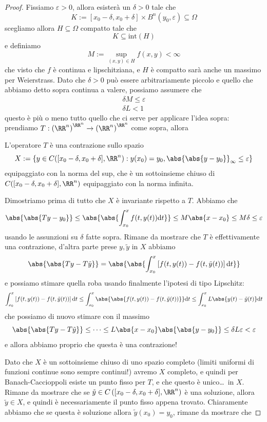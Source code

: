 \documentclass[11pt]{scrartcl}
\newcommand{\dif}{\text{d}}
\begin{document}
	\begin{proof}
		Fissiamo $\varepsilon>0$, allora esisterà un $\delta>0$ tale che
		$$K:=[x_0-\delta,x_0+\delta]\times B^n(y_0,\varepsilon)\subseteq\Omega$$
		scegliamo allora $H\subseteq \Omega$ compatto tale che
		$$K\subseteq \text{int}(H)$$
		e definiamo
		$$M:=\sup_{(x,y)\in H}f(x,y)<\infty$$
		che visto che $f$ è continua e lipschitziana, e $H$ è compatto sarà anche un massimo per Weierstrass. Dato che $\delta>0$ può essere arbitrariamente piccolo e quello che abbiamo detto sopra continua a valere, possiamo assumere che 
		\begin{gather*}
			\delta M \le \varepsilon \\
			\delta L <1
		\end{gather*}
		questo è più o meno tutto quello che ci serve per applicare l'idea sopra: prendiamo $T:\left(\RR^{n}\right)^{\RR^{n}}\to\left(\RR^{n}\right)^{\RR^{n}}$ come sopra, allora 
		\begin{claim}
			L'operatore $T$ è una contrazione sullo spazio
			$$X:=\left\{y\in C([x_0-\delta,x_0+\delta],\RR^n):y(x_0)=y_0,\abs{\abs{y-y_0}}_\infty\le \varepsilon\right\}$$
			equipaggiato con la norma del sup, che è un sottoinsieme chiuso di $C([x_0-\delta,x_0+\delta],\RR^n)$ equipaggiato con la norma infinita.
		\end{claim}
		\begin{subproof}[Sottodimostrazione]
			Dimostriamo prima di tutto che $X$ è invariante rispetto a $T$. Abbiamo che
			$$\abs{\abs{Ty-y_0}}\le \abs{\abs{\int_{x_0}^x f(t,y(t))\dif t}}\le M\abs{x-x_0}\le M\delta \le \varepsilon$$
			usando le assunzioni su $\delta$ fatte sopra. Rimane da mostrare che $T$ è effettivamente una contrazione, d'altra parte prese $y,\tilde{y}$ in $X$ abbiamo
			$$\abs{\abs{Ty-T\tilde{y}}}=\abs{\abs{\int_{x_0}^x\left[ f(t,y(t))-f(t,\tilde{y}(t))\right]\dif t}}$$ 
			e possiamo stimare quella roba usando finalmente l'ipotesi di tipo Lipschitz: 
			$$\int_{x_0}^x\left[ f(t,y(t))-f(t,\tilde{y}(t))\right]\dif t\le \int_{x_0}^x \abs{\abs{f(t,y(t))-f(t,\tilde{y}(t))}}\dif t\le \int_{x_0}^x L\abs{y(t)-\tilde{y}(t)}\dif t$$
			che possiamo di nuovo stimare con il massimo
			$$\abs{\abs{Ty-T\tilde{y}}}\le\dots\le L\abs{x-x_0}\abs{\abs{y-y_0}}\le \delta L\varepsilon<\varepsilon$$
			e allora abbiamo proprio che questa è una contrazione!
		\end{subproof}
		Dato che $X$ è un sottoinsieme chiuso di uno spazio completo (limiti uniformi di funzioni continue sono sempre continui!) avremo $X$ completo, e quindi per Banach-Caccioppoli esiste un punto fisso per $T$, e che questo è unico\dots\, in $X$. Rimane da mostrare che se $\tilde{y}\in C\left([x_0-\delta,x_0+\delta],\RR^n\right)$ è una soluzione, allora $\tilde{y}\in X$, e quindi è necessariamente il punto fisso appena trovato. Chiaramente abbiamo che se questa è soluzione allora $\tilde{y}(x_0)=y_0$, rimane da mostrare che

\end{proof}
\end{document}
